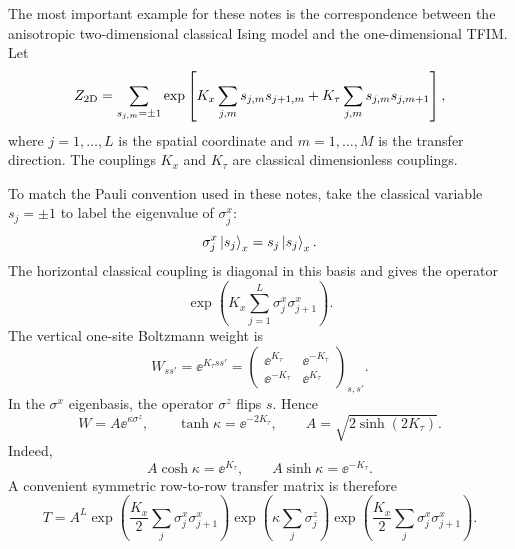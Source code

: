 The most important example for these notes is the correspondence between the
anisotropic two-dimensional classical Ising model and the one-dimensional TFIM.
Let
\begin{equation}
\label{eq:anisotropic-2d-ising-partition-function}
    Z_{\rm 2D}
    =
    \sum_{s_{j,m}=\pm1}
    \exp\left[
        K_x\sum_{j,m}s_{j,m}s_{j+1,m}
        +
        K_\tau\sum_{j,m}s_{j,m}s_{j,m+1}
    \right],
\end{equation}
where $j=1,\ldots,L$ is the spatial coordinate and $m=1,\ldots,M$ is the transfer
direction. The couplings $K_x$ and $K_\tau$ are classical dimensionless
couplings.

To match the Pauli convention used in these notes, take the classical variable
$s_j=\pm1$ to label the eigenvalue of $\sigma_j^x$:
\begin{equation}
\label{eq:x-basis-transfer}
    \sigma_j^x\left|s_j\right\rangle_x=s_j\left|s_j\right\rangle_x .
\end{equation}
The horizontal classical coupling is diagonal in this basis and gives the
operator
\begin{equation}
\label{eq:horizontal-transfer-operator}
    \exp\left(K_x\sum_{j=1}^{L}\sigma_j^x\sigma_{j+1}^x\right).
\end{equation}
The vertical one-site Boltzmann weight is
\begin{equation}
\label{eq:vertical-weight-matrix}
    W_{ss'}=\ee^{K_\tau ss'}
    =
    \begin{pmatrix}
        \ee^{K_\tau} & \ee^{-K_\tau} \\
        \ee^{-K_\tau} & \ee^{K_\tau}
    \end{pmatrix}_{s,s'} .
\end{equation}
In the $\sigma^x$ eigenbasis, the operator $\sigma^z$ flips $s$. Hence
\begin{equation}
\label{eq:vertical-weight-exp-sigmaz}
    W
    =
    A\ee^{\kappa\sigma^z},
    \qquad
    \tanh\kappa=\ee^{-2K_\tau},
    \qquad
    A=\sqrt{2\sinh(2K_\tau)} .
\end{equation}
Indeed,
\begin{equation}
    A\cosh\kappa=\ee^{K_\tau},
    \qquad
    A\sinh\kappa=\ee^{-K_\tau}.
\end{equation}
A convenient symmetric row-to-row transfer matrix is therefore
\begin{equation}
\label{eq:2d-ising-row-transfer-operator}
    T
    =
    A^L
    \exp\left(
        \frac{K_x}{2}\sum_j\sigma_j^x\sigma_{j+1}^x
    \right)
    \exp\left(
        \kappa\sum_j\sigma_j^z
    \right)
    \exp\left(
        \frac{K_x}{2}\sum_j\sigma_j^x\sigma_{j+1}^x
    \right).
\end{equation}
